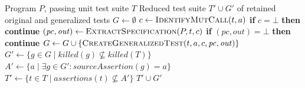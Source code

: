 \begin{algorithm}[tbp]
\caption[End-to-end semantics-based test generalization]{Semantics-Based Test Generalization}%
\label{alg:test-generalization}
\begin{algorithmic}[1]
\REQUIRE Program $P$, passing unit test suite $T$
\ENSURE Reduced test suite $T' \cup G'$ of retained original and generalized tests
\STATE $G \gets \emptyset$
        \STATE $c \gets \textsc{IdentifyMutCall}(t, a)$ 
        \STATE \textbf{if} $c = \bot$ \textbf{then} \textbf{continue}
        \STATE $(\mathit{pc}, \mathit{out}) \gets \textsc{ExtractSpecification}(P, t, c)$ 
        \STATE \textbf{if} $(\mathit{pc}, \mathit{out}) = \bot$ \textbf{then} \textbf{continue}
        \STATE $G \gets G \cup \{\textsc{CreateGeneralizedTest}(t, a, c, \mathit{pc}, \mathit{out})\}$ 
    \ENDFOR
\ENDFOR
\STATE $G' \gets \{g \in G \mid \mathit{killed}(g) \not\subseteq \mathit{killed}(T)\}$ 
\STATE $A' \gets \{a \mid \exists g \in G' : \mathit{sourceAssertion}(g) = a\}$
\STATE $T' \gets \{t \in T \mid \mathit{assertions}(t) \not\subseteq A'\}$
\RETURN $T' \cup G'$
\end{algorithmic}
\end{algorithm}
